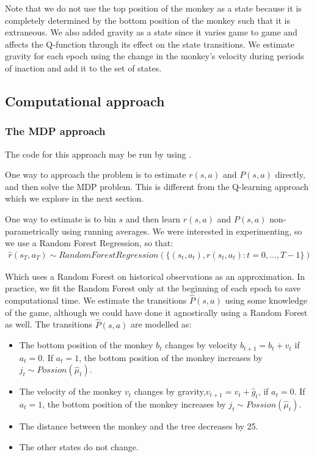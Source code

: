 \documentclass[11pt]{article}
\begin{document}
Note that we do not use the top position of the monkey as a state because it is completely determined by the bottom position of the monkey such that it is extraneous. We also added gravity as a state since it varies game to game and affects the Q-function through its effect on the state transitions. We estimate gravity for each epoch using the change in the monkey's velocity during periods of inaction and add it to the set of states.


\subsection{Computational approach}

\subsubsection{The MDP approach}

The code for this approach may be run by using .

One way to approach the problem is to estimate $r(s,a)$ and $P(s,a)$ directly, and then solve the MDP problem. This is different from the Q-learning approach which we explore in the next section.

One way to estimate is to bin $s$ and then learn $r(s,a)$ and $P(s,a)$ non-parametrically using running averages. We were interested in experimenting, so we use a Random Forest Regression, so that:
\begin{align}
    \hat{r}(s_T,a_T) \sim RandomForestRegression \left(\{(s_t,a_t), r(s_t, a_t) : t=0, \ldots, T-1 \}\right)
\end{align}

Which uses a Random Forest on historical observations as an approximation. In practice, we fit the Random Forest only at the beginning of each epoch to save computational time. We estimate the transitions $\hat{P}(s,a)$ using some knowledge of the game, although we could have done it agnostically using a Random Forest as well. The transitions $\hat{P}(s,a)$ are modelled as:
\begin{itemize}
    \item The bottom position of the monkey $b_t$ changes by velocity $b_{t+1} = b_t + v_t$ if $a_t=0$. If $a_t=1$, the bottom position of the monkey increases by $j_t \sim Possion(\hat{\mu}_t)$.
    \item The velocity of the monkey $v_t$ changes by gravity,$v_{t+1} = v_t + \hat{g}_t$, if $a_t=0$. If $a_t=1$, the bottom position of the monkey increases by $j_t \sim Possion(\hat{\mu}_t)$.
    \item The distance between the monkey and the tree decreases by 25.
    \item The other states do not change.
\end{itemize}
\end{document}
